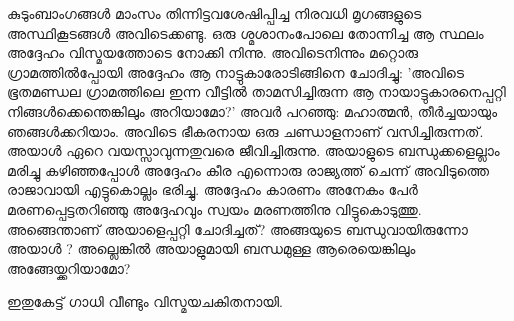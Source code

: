 കുടുംബാംഗങ്ങള്‍ മാംസം തിന്നിട്ടവശേഷിപ്പിച്ച നിരവധി മൃഗങ്ങളുടെ അസ്ഥികൂടങ്ങള്‍ അവിടെക്കണ്ടു. ഒരു ശ്മശാനംപോലെ തോന്നിച്ച ആ സ്ഥലം അദ്ദേഹം വിസ്മയത്തോടെ നോക്കി നിന്നു. അവിടെനിന്നും മറ്റൊരു ഗ്രാമത്തില്‍പ്പോയി അദ്ദേഹം ആ നാട്ടുകാരോടിങ്ങിനെ ചോദിച്ചു: 'അവിടെ ഭൂതമണ്ഡല ഗ്രാമത്തിലെ ഇന്ന വീട്ടില്‍ താമസിച്ചിരുന്ന ആ നായാട്ടുകാരനെപ്പറ്റി നിങ്ങള്‍ക്കെന്തെങ്കിലും അറിയാമോ?' അവര്‍ പറഞ്ഞു: മഹാത്മന്‍, തീര്‍ച്ചയായും ഞങ്ങള്‍ക്കറിയാം. അവിടെ ഭീകരനായ ഒരു ചണ്ഡാളനാണ് വസിച്ചിരുന്നത്. അയാള്‍ ഏറെ വയസ്സാവുന്നതുവരെ ജീവിച്ചിരുന്നു. അയാളുടെ ബന്ധുക്കളെല്ലാം മരിച്ചു കഴിഞ്ഞപ്പോള്‍ അദ്ദേഹം കീര എന്നൊരു രാജ്യത്ത് ചെന്ന് അവിടുത്തെ രാജാവായി എട്ടുകൊല്ലം ഭരിച്ചു. അദ്ദേഹം കാരണം അനേകം പേര്‍ മരണപ്പെട്ടതറിഞ്ഞു അദ്ദേഹവും സ്വയം മരണത്തിനു വിട്ടുകൊടുത്തു. അങ്ങെന്താണ് അയാളെപ്പറ്റി ചോദിച്ചത്? അങ്ങയുടെ ബന്ധുവായിരുന്നോ അയാള്‍ ? അല്ലെങ്കില്‍ അയാളുമായി ബന്ധമുള്ള ആരെയെങ്കിലും അങ്ങേയ്ക്കറിയാമോ?

ഇതുകേട്ട് ഗാധി വീണ്ടും വിസ്മയചകിതനായി.